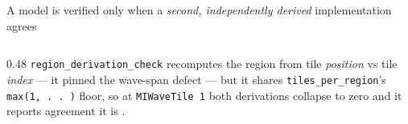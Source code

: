 \begin{frame}{A model is verified only when a \emph{second, independently derived} implementation agrees}
\begin{columns}[T]
\begin{column}{0.48\textwidth}
\medskip
{} \texttt{region\_derivation\_check} recomputes the region from tile
\emph{position} vs tile \emph{index} --- it pinned the wave-span defect --- but it shares
\texttt{tiles\_per\_region}'s \texttt{max(1,\,.\,.\,)} floor, so at \texttt{MIWaveTile 1} both
derivations collapse to zero and it reports agreement it is .

\smallskip
{}
\end{column}
\end{columns}
\end{frame}
